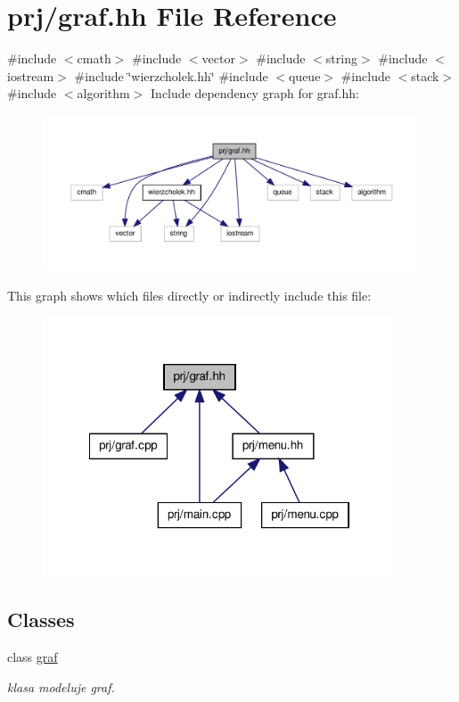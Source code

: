 \hypertarget{graf_8hh}{\section{prj/graf.hh \-File \-Reference}
\label{graf_8hh}
}
{\ttfamily \#include $<$cmath$>$}\*
{\ttfamily \#include $<$vector$>$}\*
{\ttfamily \#include $<$string$>$}\*
{\ttfamily \#include $<$iostream$>$}\*
{\ttfamily \#include \char`\"{}wierzcholek.\-hh\char`\"{}}\*
{\ttfamily \#include $<$queue$>$}\*
{\ttfamily \#include $<$stack$>$}\*
{\ttfamily \#include $<$algorithm$>$}\*
\-Include dependency graph for graf.\-hh\-:
\nopagebreak
\begin{figure}[H]
\begin{center}
\leavevmode
\includegraphics[width=350pt]{graf_8hh__incl}
\end{center}
\end{figure}
\-This graph shows which files directly or indirectly include this file\-:\nopagebreak
\begin{figure}[H]
\begin{center}
\leavevmode
\includegraphics[width=297pt]{graf_8hh__dep__incl}
\end{center}
\end{figure}
\subsection*{\-Classes}
\begin{DoxyCompactItemize}
\item 
class \hyperlink{classgraf}{graf}
\begin{DoxyCompactList}\small\item\em klasa modeluje graf. \end{DoxyCompactList}\end{DoxyCompactItemize}
